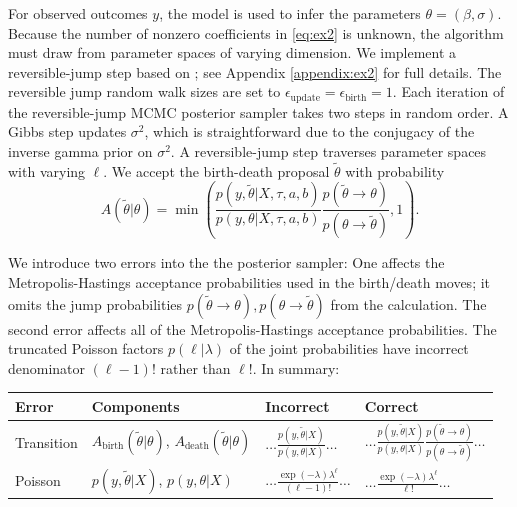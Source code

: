 \documentclass{article}
\begin{document}
For observed outcomes $y$, the model is used to infer the parameters $\theta = (\beta, \sigma)$.
Because the number of nonzero coefficients in \eqref{eq:ex2} is unknown, the algorithm must draw from parameter spaces of varying dimension. 
We implement a reversible-jump step \citep{green_reversible_1995} based on \cite{chen_bayesian_2011}; see Appendix \ref{appendix:ex2} for full details. 
The reversible jump random walk sizes are set to $\epsilon_\text{update}= \epsilon_\text{birth}=1$. Each iteration of the reversible-jump MCMC posterior sampler takes two steps in random order. A Gibbs step updates $\sigma^{2}$, which is straightforward due to the conjugacy of the inverse gamma prior on $\sigma^{2}$. A reversible-jump step traverses parameter spaces with varying $\ell$. 
We accept the birth-death proposal $\tilde{\theta}$ with probability 
\begin{equation}
    A(\tilde{\theta}|\theta) = \min{\left(\frac{p(y, \tilde{\theta} | X, \tau, a, b )}{p(y, \theta | X, \tau, a, b )} \frac{p(\tilde{\theta} \rightarrow \theta)}{p(\theta \rightarrow \tilde{\theta})}, 1\right)}.
\end{equation}

We introduce two errors into the the posterior sampler: One affects the Metropolis-Hastings acceptance probabilities used in the birth/death moves; it omits the jump probabilities $p(\tilde{\theta} \rightarrow \theta), p(\theta \rightarrow \tilde{\theta})$ from the calculation. The second error affects all of the Metropolis-Hastings acceptance probabilities. The truncated Poisson factors $p(\ell|\lambda)$  of the joint probabilities have incorrect denominator $(\ell-1)!$ rather than $\ell!$. In summary:
\begin{center}
   \begin{tabular}{llll}
                  Error & Components & Incorrect & Correct \\
    \midrule  
         Transition & $A_{\text{birth}}(\tilde{\theta}|\theta)$, $A_{\text{death}}(\tilde{\theta}|\theta)$  &  $\ldots\frac{p(y, \tilde{\theta} | X )}{p(y, \theta | X )}\ldots$ & $\ldots\frac{p(y, \tilde{\theta} | X )}{p(y, \theta | X )} \frac{p(\tilde{\theta} \rightarrow \theta)}{p(\theta \rightarrow \tilde{\theta})}\ldots$\\
         Poisson & $p(y, \tilde{\theta} | X )$, $p(y, \theta | X )$ & $\ldots \frac{\exp{(-\lambda)} \lambda^{\ell}}{(\ell-1)!} \ldots$ & $\ldots \frac{\exp{(-\lambda)} \lambda^{\ell}}{\ell!} \ldots$ \\
\end{tabular}
\end{center}    
\end{document}
